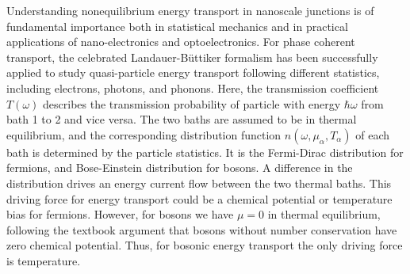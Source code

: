 \documentclass[aps
,twocolumn
,floatfix,footinbib,prl
]{revtex4-1}
\begin{document}
Understanding nonequilibrium energy transport in nanoscale junctions is of fundamental importance both in statistical mechanics and in practical applications of nano-electronics and optoelectronics. For phase coherent transport, the celebrated Landauer-B\"uttiker formalism has been successfully applied to study quasi-particle energy transport following different statistics, including electrons\cite{imry1999conductance}, photons\cite{ojanen2008mesoscopic,biehs2010mesoscopic,zhang2018energy,benabdallah2014near}, and phonons\cite{rego1998quantized,mingo2005carbon,yamamoto2006nonequilibrium,wang2006nonequilibrium,wang2007nonequilibrium,wang2008quantum,ruokola2009thermal,li2012colloquium,taylor2015quantum,wang2016landauer}.
Here, the transmission coefficient $T(\omega)$ describes the transmission probability of particle with energy $\hbar\omega$ from bath 1 to 2 and vice versa. The two baths are assumed to be in thermal equilibrium, and the corresponding distribution function $n(\omega,\mu_\alpha,T_\alpha)$ of each bath is determined by the particle statistics. It is the Fermi-Dirac distribution for fermions, and Bose-Einstein distribution for bosons. A difference in the distribution drives an energy current flow between the two thermal baths. This driving force for energy transport could be a chemical potential or temperature bias for fermions. However, for bosons we have $\mu=0$ in thermal equilibrium, following the textbook argument that bosons without number conservation have zero chemical potential. Thus, for bosonic energy transport the only driving force is temperature.


\end{document}

